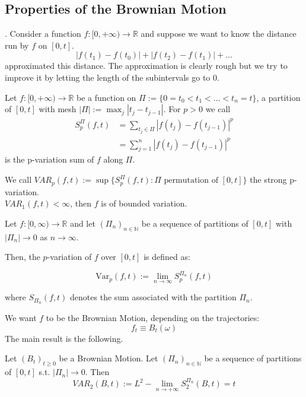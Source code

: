 \documentclass[crop=false, class=article]{standalone}
\begin{document}
	\subsection{Properties of the Brownian Motion}.
Consider a function $f:[0,+\infty) \rightarrow \mathbb{R}$ and suppose we want to know the distance run by $f$ on $[0,t]$. 
\begin{equation*}
	|f(t_1) - f(t_0)|+|f(t_2) - f(t_1)|+ \ldots
\end{equation*}
approximated this distance. The approximation is clearly rough but we try to improve it by letting the length of the subintervals go to $0$. 
\begin{definition}
	Let $f:[0,+\infty) \to \mathbb{R}$ be a function on $\Pi := \{0 = t_0 < t_1 < \ldots < t_n = t\}$, a partition of $[0,t]$ with mesh $|\Pi| := \max_j |t_j - t_{j-1}|$. For $p > 0$ we call 
	\begin{align*}
		S_p^\Pi(f,t) &= \sum_{t_j \in \Pi} |f(t_j) - f(t_{j-1})|^p\\
		&= \sum_{j=1}^n |f(t_j) - f(t_{j-1})|^p
	\end{align*}
	is the p-variation sum of $f$ along $\Pi$. 
\end{definition}
We call $VAR_p(f,t) := \sup\{S_p^\Pi(f,t): \Pi \text{ permutation of } [0,t]\}$ the strong p-variation.\\
$VAR_1(f,t) < \infty$, then $f$ is of bounded variation.  
\begin{definition}[$p$-variation]
	Let \( f \colon [0, \infty) \to \mathbb{R} \) and let \( (\Pi_n)_{n \in \mathbb{N}} \) be a sequence of partitions of \([0, t]\) with \( |\Pi_n| \to 0 \) as \( n \to \infty \). 
	
	Then, the \(p\)-variation of \(f\) over \([0,t]\) is defined as:
	
	\[
	\text{Var}_p(f, t) := \lim_{n \to \infty} S_p^{\Pi_n}(f, t)
	\]
	
	where \( S_{\Pi_n}(f, t) \) denotes the sum associated with the partition \(\Pi_n\).
\end{definition}
We want $f$ to be the Brownian Motion, depending on the trajectories:
\begin{equation*}
	f_t \equiv B_t(\omega)   
\end{equation*}
The main result is the following.
\begin{theorem}
	Let $(B_t)_{t \geq 0}$ be a Brownian Motion. Let $(\Pi_n)_{n \in \mathbb{N}}$ be a sequence of partitions of $[0,t]$ s.t. $|\Pi_n| \rightarrow 0$. Then
	\begin{equation*}
		VAR_2(B,t) := L^2-\lim_{n \rightarrow +\infty} S_2^{\Pi_n}(B,t) = t
	\end{equation*}
\end{theorem}
\end{document}
